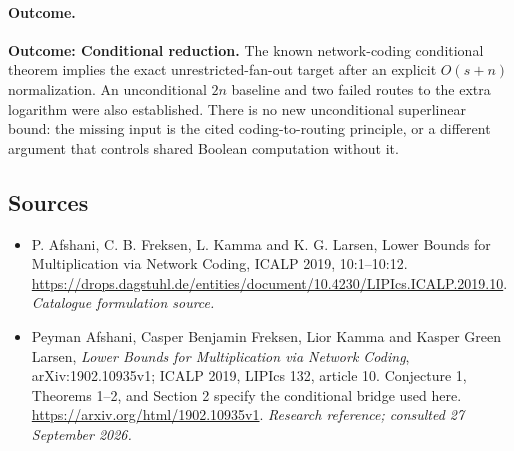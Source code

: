 \documentclass[11pt,a4paper]{article}
\numberwithin{equation}{section}
\begin{document}
\paragraph{Outcome.}
\textbf{Outcome: Conditional reduction.}
The known network-coding conditional theorem implies the exact unrestricted-fan-out target after an explicit $O(s+n)$ normalization. An unconditional $2n$ baseline and two failed routes to the extra logarithm were also established. There is no new unconditional superlinear bound: the missing input is the cited coding-to-routing principle, or a different argument that controls shared Boolean computation without it.

\subsection{Sources}
\begin{itemize}\raggedright
\item[\textnormal{[S1]}]\hypertarget{source:30006781:1}{} P. Afshani, C. B. Freksen, L. Kamma and K. G. Larsen, Lower Bounds for Multiplication via Network Coding, ICALP 2019, 10:1–10:12.
\url{https://drops.dagstuhl.de/entities/document/10.4230/LIPIcs.ICALP.2019.10}.
{\small\textit{Catalogue formulation source.}}
\item[\textnormal{[E1]}]\hypertarget{extra:30006781:1}{} Peyman Afshani, Casper Benjamin Freksen, Lior Kamma and Kasper Green Larsen, \emph{Lower Bounds for Multiplication via Network Coding}, arXiv:1902.10935v1; ICALP 2019, LIPIcs 132, article 10. Conjecture 1, Theorems 1--2, and Section 2 specify the conditional bridge used here.
\url{https://arxiv.org/html/1902.10935v1}.
{\small\textit{Research reference; consulted 27 September 2026.}}
\end{itemize}
\end{document}
